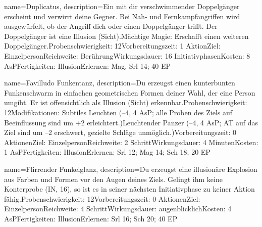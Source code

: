 {
    name={Duplicatus},
    description={Ein mit dir verschwimmender Doppelgänger erscheint und verwirrt deine Gegner. Bei Nah- und Fernkampfangriffen wird ausgewürfelt, ob der Angriff dich oder einen Doppelgänger trifft. Der Doppelgänger ist eine Illusion (Sicht).\newline Mächtige Magie: Erschafft einen weiteren Doppelgänger.\newline Probenschwierigkeit: 12\newline Vorbereitungszeit: 1 Aktion\newline Ziel: Einzelperson\newline Reichweite: Berührung\newline Wirkungsdauer: 16 Initiativphasen\newline Kosten: 8 AsP\newline Fertigkeiten: Illusion\newline Erlernen: Mag, Srl 14; 40 EP}
}


{
    name={Favilludo Funkentanz},
    description={Du erzeugst einen kunterbunten Funkenschwarm in einfachen geometrischen Formen deiner Wahl, der eine Person umgibt. Er ist offensichtlich als Illusion (Sicht) erkennbar.\newline Probenschwierigkeit: 12\newline Modifikationen: Subtiles Leuchten (–4, 4 AsP; alle Proben des Ziels auf Beeinflussung sind um +2 erleichtert.)\newline Leuchtender Panzer (–4, 4 AsP; AT auf das Ziel sind um –2 erschwert, gezielte Schläge unmöglich.)\newline Vorbereitungszeit: 0 Aktionen\newline Ziel: Einzelperson\newline Reichweite: 2 Schritt\newline Wirkungsdauer: 4 Minuten\newline Kosten: 1 AsP\newline Fertigkeiten: Illusion\newline Erlernen: Srl 12; Mag 14; Sch 18; 20 EP}
}


{
    name={Flirrender Funkelglanz},
    description={Du erzeugst eine illusionäre Explosion aus Farben und Formen vor den Augen deines Ziels. Gelingt ihm keine Konterprobe (IN, 16), so ist es in seiner nächsten Initiativphase zu keiner Aktion fähig.\newline Probenschwierigkeit: 12\newline Vorbereitungszeit: 0 Aktionen\newline Ziel: Einzelperson\newline Reichweite: 4 Schritt\newline Wirkungsdauer: augenblicklich\newline Kosten: 4 AsP\newline Fertigkeiten: Illusion\newline Erlernen: Srl 16; Sch 20; 40 EP}
}



